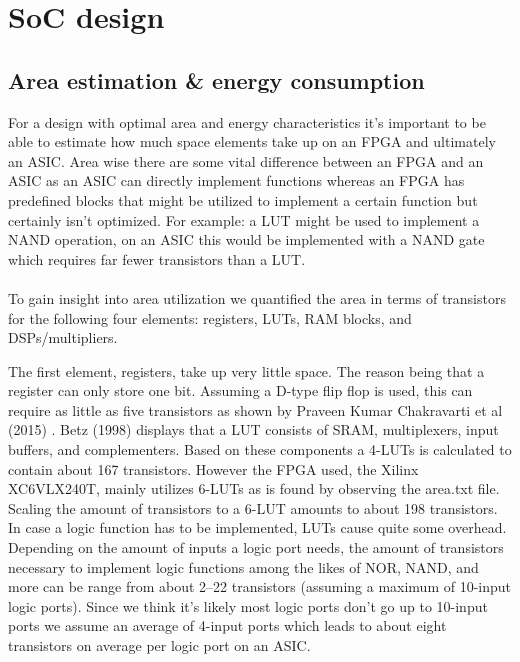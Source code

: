 \section{SoC design}
\subsection{Area estimation \& energy consumption}
For a design with optimal area and energy characteristics it's important to be able to estimate how much space elements take up on an FPGA and ultimately an ASIC. 
Area wise there are some vital difference between an FPGA and an ASIC as an ASIC can directly implement functions whereas an FPGA has predefined blocks that might be utilized to implement a certain function but certainly isn't optimized. 
For example: a LUT might be used to implement a NAND operation, on an ASIC this would be implemented with a NAND gate which requires far fewer transistors than a LUT.\\\\
To gain insight into area utilization we quantified the area in terms of transistors for the following four elements: registers, LUTs, RAM blocks, and DSPs/multipliers. 

The first element, registers, take up very little space. 
The reason being that a register can only store one bit. Assuming a D-type flip flop is used, this can require as little as five transistors as shown by Praveen Kumar Chakravarti et al (2015) \cite{Chakravarti}.
Betz (1998) \cite{betz} displays that a LUT consists of SRAM, multiplexers, input buffers, and complementers. 
Based on these components a 4-LUTs is calculated to contain about \num{167} transistors. However the FPGA used, the Xilinx XC6VLX240T, mainly utilizes 6-LUTs as is found by observing the area.txt file. 
Scaling the amount of transistors to a 6-LUT amounts to about 198 transistors. 
In case a logic function has to be implemented, LUTs cause quite some overhead. 
Depending on the amount of inputs a logic port needs, the amount of transistors necessary to implement logic functions among the likes of NOR, NAND, and more can be range from about \numrange{2}{22} transistors (assuming a maximum of 10-input logic ports). 
Since we think it's likely most logic ports don't go up to 10-input ports we assume an average of 4-input ports which leads to about eight transistors on average per logic port on an ASIC.\\

